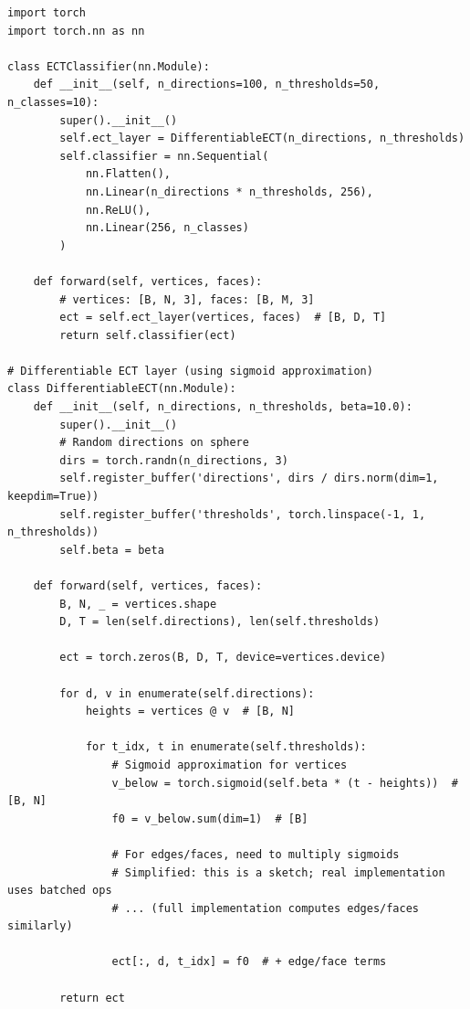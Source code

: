 \begin{lstlisting}[style=python,caption=ECT-based shape classification]
import torch
import torch.nn as nn

class ECTClassifier(nn.Module):
    def __init__(self, n_directions=100, n_thresholds=50, n_classes=10):
        super().__init__()
        self.ect_layer = DifferentiableECT(n_directions, n_thresholds)
        self.classifier = nn.Sequential(
            nn.Flatten(),
            nn.Linear(n_directions * n_thresholds, 256),
            nn.ReLU(),
            nn.Linear(256, n_classes)
        )
    
    def forward(self, vertices, faces):
        # vertices: [B, N, 3], faces: [B, M, 3]
        ect = self.ect_layer(vertices, faces)  # [B, D, T]
        return self.classifier(ect)

# Differentiable ECT layer (using sigmoid approximation)
class DifferentiableECT(nn.Module):
    def __init__(self, n_directions, n_thresholds, beta=10.0):
        super().__init__()
        # Random directions on sphere
        dirs = torch.randn(n_directions, 3)
        self.register_buffer('directions', dirs / dirs.norm(dim=1, keepdim=True))
        self.register_buffer('thresholds', torch.linspace(-1, 1, n_thresholds))
        self.beta = beta
    
    def forward(self, vertices, faces):
        B, N, _ = vertices.shape
        D, T = len(self.directions), len(self.thresholds)
        
        ect = torch.zeros(B, D, T, device=vertices.device)
        
        for d, v in enumerate(self.directions):
            heights = vertices @ v  # [B, N]
            
            for t_idx, t in enumerate(self.thresholds):
                # Sigmoid approximation for vertices
                v_below = torch.sigmoid(self.beta * (t - heights))  # [B, N]
                f0 = v_below.sum(dim=1)  # [B]
                
                # For edges/faces, need to multiply sigmoids
                # Simplified: this is a sketch; real implementation uses batched ops
                # ... (full implementation computes edges/faces similarly)
                
                ect[:, d, t_idx] = f0  # + edge/face terms
        
        return ect
\end{lstlisting}

